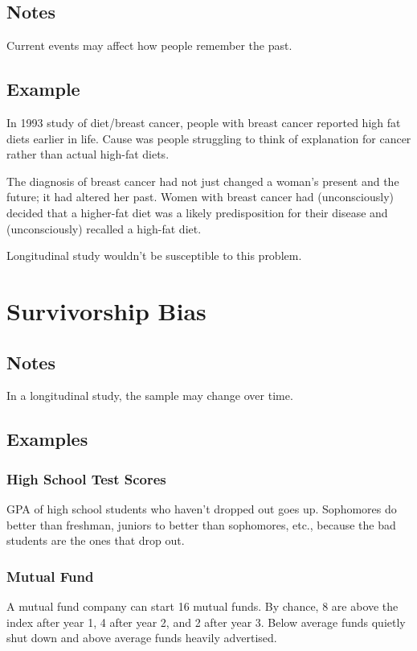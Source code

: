 \documentclass[landscape]{exam}
\begin{document}
  \subsection{Notes}

  Current events may affect how people remember the past.  

  \subsection{Example}

  In 1993 study of diet/breast cancer, people with breast cancer reported high
  fat diets earlier in life.  Cause was people struggling to think of
  explanation for cancer rather than actual high-fat diets.

  \begin{em}
    The diagnosis of breast cancer had not just changed a woman’s present and the
    future; it had altered her past. Women with breast cancer had (unconsciously)
    decided that a higher-fat diet was a likely predisposition for their disease
    and (unconsciously) recalled a high-fat diet.
  \end{em}

  Longitudinal study wouldn't be susceptible to this problem.

  \section{Survivorship Bias}
  \subsection{Notes}
  In a longitudinal study, the sample may change over time.

  \subsection{Examples}
  \subsubsection{High School Test Scores}
  GPA of high school students who haven't dropped out goes up.  Sophomores do
  better than freshman, juniors to better than sophomores, etc., because the bad
  students are the ones that drop out.

  \subsubsection{Mutual Fund}
  A mutual fund company can start 16 mutual funds.  By chance, 8 are above
  the index after year 1, 4 after year 2, and 2 after year 3.  Below average
  funds quietly shut down and above average funds heavily advertised.
\end{document}
